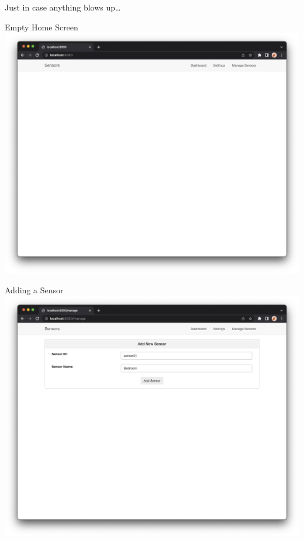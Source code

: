 \documentclass[aspectratio=169]{beamer}
\begin{document}
  \section{\sectitle}
  \begin{frame}{\sectitle}
    \begin{center}
      \huge Just in case anything blows up\dots
    \end{center}
  \end{frame}
  \begin{frame}{\sectitle}{Empty Home Screen}
    \centering\includegraphics[width=.75\textwidth]{images/01-home.png}
  \end{frame}
  \begin{frame}{\sectitle}{Adding a Sensor}
    \centering\includegraphics[width=.75\textwidth]{images/02-add.png}
  \end{frame}
\end{document}
